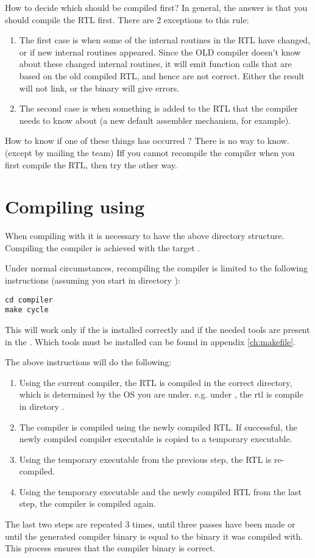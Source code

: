 \documentclass{report}
\begin{document}
How to decide which should be compiled first? In general, the answer is that
you should compile the RTL first. There are 2 exceptions to this rule:
\begin{enumerate}
\item The first case is when some of the internal routines in the RTL
have changed, or if new internal routines appeared. Since the OLD compiler
doesn't know about these changed internal routines, it will emit function
calls that are based on the old compiled RTL, and hence are not correct.
Either the result will not link, or the binary will give errors.
\item The second case is when something is added to the RTL that the
compiler needs to know about (a new default assembler mechanism, for
example).
\end{enumerate}
How to know if one of these things has occurred ? There is no way to know.
(except by mailing the \fpc team) Iff you cannot recompile the compiler
when you first compile the RTL, then try the other way.

\section{Compiling using }

When compiling with  it is necessary to have the above directory
structure. Compiling the compiler is achieved with the target .

Under normal circumstances, recompiling the compiler is limited to the
following instructions (assuming you start in directory ):
\begin{verbatim}
cd compiler
make cycle
\end{verbatim}
This will work only if the  is installed correctly and
if the needed tools are present in the . Which tools must be
installed can be found in appendix \ref{ch:makefile}.

The above instructions will do the following:
\begin{enumerate}
\item Using the current compiler, the RTL is compiled in the correct
directory, which is determined by the OS you are under. e.g. under \linux,
the rtl is compile in diretory .
\item The compiler is compiled using the newly compiled RTL. If successful,
the newly compiled compiler executable is copied to a temporary executable.
\item Using the temporary executable from the previous step, the RTL is
re-compiled.
\item Using the temporary executable and the newly compiled RTL from the
last step, the compiler is compiled again.
\end{enumerate}
The last two steps are repeated 3 times, until three passes have been made or
until the generated compiler binary is equal to the binary it was compiled
with. This process ensures that the compiler binary is correct.
\end{document}
